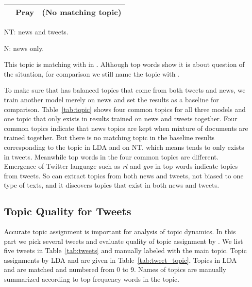 \begin{table*}[htpb]
\begin{threeparttable}
\begin{tabular}{|c|c|l|}
 & Pray & (No matching topic)\\ \hline
\end{tabular}
\begin{tablenotes}
\footnotesize
\item[1] NT: news and tweets.
\item[2] N: news only.
\item[3] This topic is matching with \obamatalk in \stlda. Although top words show it is about question of the situation, for comparison we still name the topic with \obamatalk.
\end{tablenotes}
\caption{Topic Examples}\label{tab:topic}
\end{threeparttable}
\end{table*}

To make sure that \stlda has balanced topics that come from both tweets and news, we train another model merely on news and set the results as a baseline for comparison. Table~\ref{tab:topic} shows four common topics for all three models and one topic that only exists in results trained on news and tweets together. Four common topics indicate that news topics are kept when mixture of documents are trained together. But there is no matching topic in the baseline results corresponding to the topic \pray in LDA and \stlda on NT, which means \pray tends to only exists in tweets. Meanwhile top words in the four common topics are different. Emergence of Twitter language such as \emph{rt} and \emph{gov} in top words indicate topics from tweets. So \stlda can extract topics from both news and tweets, not biased to one type of texts, and it discovers topics that exist in both news and tweets.

\subsection{Topic Quality for Tweets}
\label{subsec:intrinsic}

Accurate topic assignment is important for analysis of topic dynamics. In this part we pick several tweets and evaluate quality of topic assignment by \stlda. We list five tweets in Table~\ref{tab:tweets} and manually labeled with the main topic. Topic assignments by LDA and \stlda are given in Table~\ref{tab:tweet_topic}. Topics in LDA and \stlda are matched and numbered from 0 to 9. Names of topics are manually summarized according to top frequency words in the topic.

